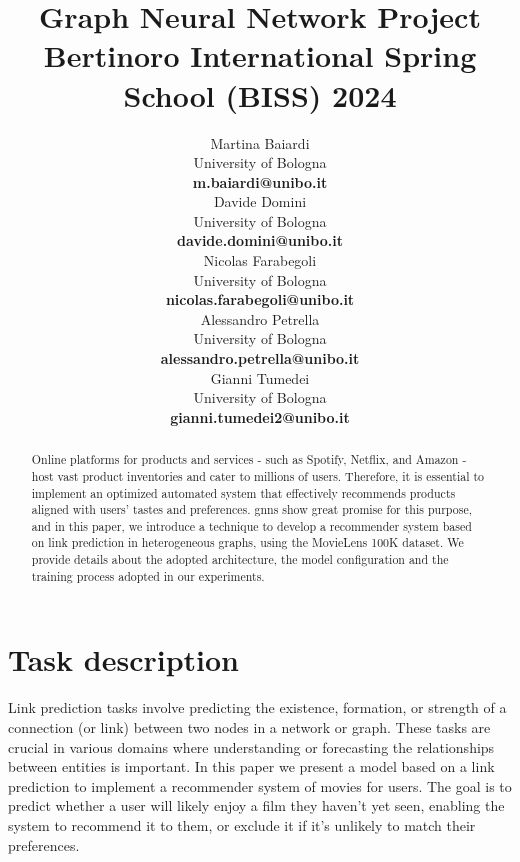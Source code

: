 \documentclass[11pt]{article}
\title{Graph Neural Network Project \\
Bertinoro International Spring School (BISS) 2024}
\author{
  Martina Baiardi \\
  University of Bologna \\
  {\bf m.baiardi@unibo.it} \\ \And
  Davide Domini \\
  University of Bologna \\
  {\bf davide.domini@unibo.it} \\  \And
  Nicolas Farabegoli \\
  University of Bologna \\
  {\bf nicolas.farabegoli@unibo.it} \\  \AND
  Alessandro Petrella\\
  University of Bologna \\
  {\bf alessandro.petrella@unibo.it} \\ \And
  Gianni Tumedei \\
  University of Bologna \\
  {\bf gianni.tumedei2@unibo.it}
}
\begin{document}
\maketitle

\begin{abstract}

Online platforms for products and services - such as Spotify, Netflix, and Amazon - 
host vast product inventories and cater to millions of users. 
Therefore, it is essential to implement an optimized automated system that effectively 
recommends products aligned with users' tastes and preferences.  
%
\acp{gnn} show great promise for this purpose, and in this paper, 
we introduce a technique to develop a recommender system based on 
link prediction in heterogeneous graphs, using the MovieLens 100K dataset.
%
We provide details about the adopted architecture, the model configuration and the training
process adopted in our experiments.


\end{abstract}

\section{Task description}\label{sec:task-description}
Link prediction tasks involve predicting the existence, formation, 
or strength of a connection (or link) between two nodes in a network or graph. 
These tasks are crucial in various domains where understanding or forecasting the relationships 
between entities is important. 
In this paper we present a model based on a link prediction to implement a recommender system of movies for users.
The goal is to predict whether a user will likely enjoy a film they haven't yet seen, 
enabling the system to recommend it to them, or exclude it if it's unlikely to match their preferences.
\end{document}
